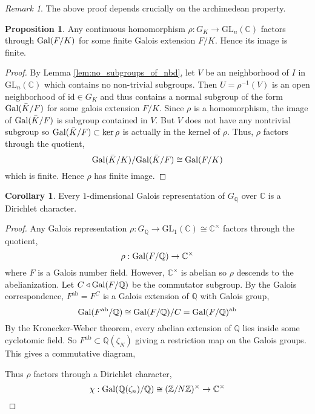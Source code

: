 \documentclass[12pt]{article}
\newcommand{\Z}{\mathbb{Z}}
\newcommand{\C}{\mathbb{C}}
\newcommand{\Q}{\mathbb{Q}}
\newcommand{\Gal}[1]{\mathrm{Gal} \small(#1 \small)}
\newcommand{\id}{\mathrm{id}}
\newcommand{\ab}{\mathrm{ab}}
\newcommand{\GL}[2]{\mathrm{GL}_{#1}(#2)}
\theoremstyle{remark}
\newtheorem*{remark}{Remark}
\theoremstyle{definition}
\newtheorem{proposition}[theorem]{Proposition}
\newtheorem{corollary}[theorem]{Corollary}
\begin{document}
\begin{remark}
The above proof depends crucially on the archimedean property. 
\end{remark}

\begin{proposition}
Any continuous homomorphism $\rho: G_{K} \to \GL{n}{\C}$ factors through $\Gal{F/K}$ for some finite Galois extension $F / K$. Hence its image is finite.
\end{proposition}
\begin{proof}
By Lemma \ref{lem:no_subgroups_of_nbd}, let $V$ be an neighborhood of $I$ in $\GL{n}{\C}$ which contains no non-trivial subgroups. Then $U = \rho^{-1}(V)$ is an open neighborhood of $\id \in G_K$ and thus contains a normal subgroup of the form $\Gal{\bar{K} / F}$ for some galois extension $F / K$.
Since $\rho$ is a homomorphism, the image of $\Gal{\bar{K} / F}$ is subgroup contained in $V$. But $V$ does not have any nontrivial subgroup so $\Gal{\bar{K} / F } \subset \ker{\rho}$ is actually in the kernel of $\rho$. Thus, $\rho$ factors through the quotient,
\[ \Gal{\bar{K} / K} / \Gal{\bar{K} / F} \cong \Gal{F / K} \]
which is finite. Hence $\rho$ has finite image.
\end{proof}

\begin{corollary}
Every $1$-dimensional Galois representation of $G_{\Q}$ over $\C$ is a Dirichlet character. 
\end{corollary}

\begin{proof}
Any Galois representation $\rho : G_{\Q} \to \GL{1}{\C} \cong \C^\times$ factors through the quotient,
\[ \rho : \Gal{F / \Q} \to \C^\times \]
where $F$ is a Galois number field. However, $\C^\times$ is abelian so $\rho$ descends to the abelianization.
Let $C \triangleleft \Gal{F / \Q}$ be the commutator subgroup. By the Galois correspondence, $F^{\ab} = F^C$ is a Galois extension of $\Q$ with Galois group,
\[ \Gal{F^{\ab} / \Q} \cong \Gal{F / \Q} / C = \Gal{F / \Q}^{\ab} \]
By the Kronecker-Weber theorem, every abelian extension of $\Q$ lies inside some cyclotomic field. So $F^{\ab} \subset \Q(\zeta_N)$ giving a restriction map on the Galois groups. This gives a commutative diagram,
\begin{center}
\end{center}
Thus $\rho$ factors through a Dirichlet character,
\[ \chi : \Gal{ \Q(\zeta_n) / \Q } \cong (\Z / N \Z)^\times \to \C^\times \]
\end{proof}
\end{document}

